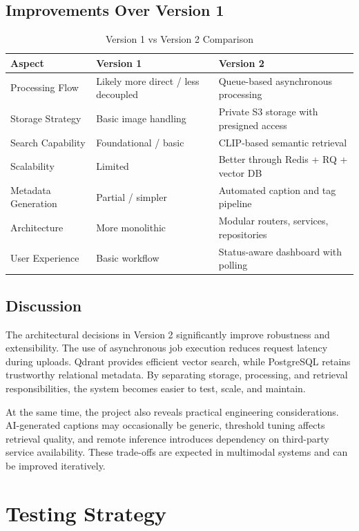 \documentclass[12pt,a4paper]{report}
\begin{document}
\section{Improvements Over Version 1}
\begin{table}[H]
\centering
\caption{Version 1 vs Version 2 Comparison}
\begin{tabularx}{\textwidth}{|l|X|X|}
\hline
\textbf{Aspect} & \textbf{Version 1} & \textbf{Version 2} \\
\hline
Processing Flow & Likely more direct / less decoupled & Queue-based asynchronous processing \\
\hline
Storage Strategy & Basic image handling & Private S3 storage with presigned access \\
\hline
Search Capability & Foundational / basic & CLIP-based semantic retrieval \\
\hline
Scalability & Limited & Better through Redis + RQ + vector DB \\
\hline
Metadata Generation & Partial / simpler & Automated caption and tag pipeline \\
\hline
Architecture & More monolithic & Modular routers, services, repositories \\
\hline
User Experience & Basic workflow & Status-aware dashboard with polling \\
\hline
\end{tabularx}
\end{table}

\section{Discussion}
The architectural decisions in Version 2 significantly improve robustness and extensibility. The use of asynchronous job execution reduces request latency during uploads. Qdrant provides efficient vector search, while PostgreSQL retains trustworthy relational metadata. By separating storage, processing, and retrieval responsibilities, the system becomes easier to test, scale, and maintain.

At the same time, the project also reveals practical engineering considerations. AI-generated captions may occasionally be generic, threshold tuning affects retrieval quality, and remote inference introduces dependency on third-party service availability. These trade-offs are expected in multimodal systems and can be improved iteratively.

\chapter{Testing Strategy}
\end{document}
